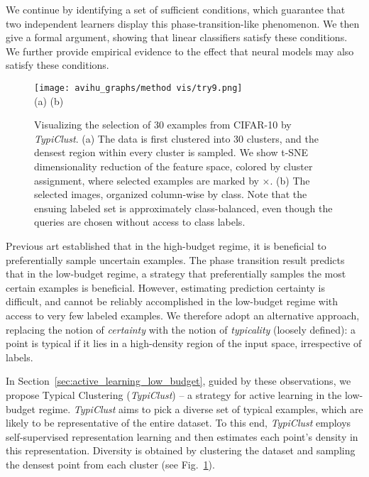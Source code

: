 \documentclass{article}
\begin{document}
We continue by identifying a set of sufficient conditions, which guarantee that two independent learners display this phase-transition-like phenomenon. We then give a formal argument, showing that linear classifiers satisfy these conditions. We further provide empirical evidence to the effect that neural models may also satisfy these conditions. 

\begin{figure}[b!]
\begin{center}
\vspace{-0.3cm}
\texttt{[image: avihu\_graphs/method vis/try9.png]} \\
\footnotesize{(a) \hspace{3.5cm} (b) \hspace{1.5cm}}
\vspace{-0.2cm}
\caption{Visualizing the selection of 30 examples from CIFAR-10 by \emph{TypiClust}. (a) The data is first clustered into 30 clusters, and the densest region within every cluster is sampled. We show t-SNE dimensionality reduction of the feature space, colored by cluster assignment, where selected examples are marked by $\times$. (b) The selected images, organized column-wise by class. Note that the ensuing labeled set is approximately class-balanced, even though the queries are chosen without access to class labels.}
\label{fig:cifar10_examples}
\end{center}
\end{figure}

Previous art established that in the high-budget regime, it is beneficial to preferentially sample uncertain examples. The phase transition result predicts that in the low-budget regime, a strategy that preferentially samples the most certain examples is beneficial. However, estimating prediction certainty is difficult, and cannot be reliably accomplished in the low-budget regime with access to very few labeled examples. We therefore adopt an alternative approach, replacing the notion of \emph{certainty} with the notion of \emph{typicality} (loosely defined): a point is typical if it lies in a high-density region of the input space, irrespective of labels. 

In Section~\ref{sec:active_learning_low_budget}, guided by these observations, we propose Typical Clustering (\emph{TypiClust}) -- a strategy for active learning in the low-budget regime. \emph{TypiClust} aims to pick a diverse set of typical examples, which are likely to be representative of the entire dataset. To this end, \emph{TypiClust} employs self-supervised representation learning and then estimates each point's density in this representation. Diversity is obtained by clustering the dataset and sampling the densest point from each cluster (see Fig.~\ref{fig:cifar10_examples}). 
\end{document}
